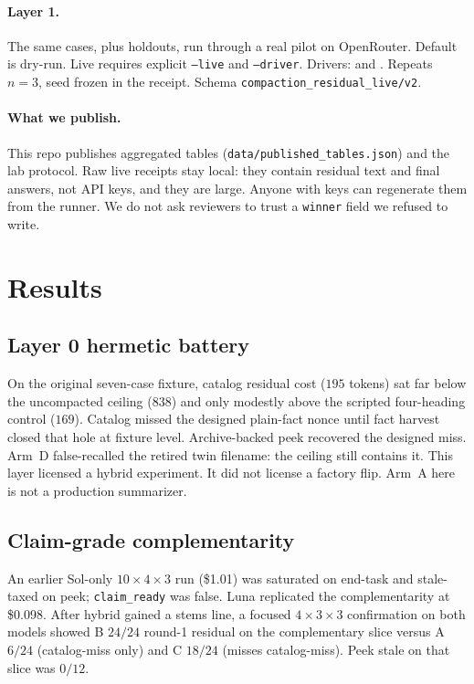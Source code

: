 \documentclass[11pt]{article}
\newcommand{\arm}[1]{\textsf{#1}}
\begin{document}
\paragraph{Layer 1.}
The same cases, plus holdouts, run through a real pilot on OpenRouter.
Default is dry-run. Live requires explicit \texttt{--live} and
\texttt{--driver}. Drivers:
 and
. Repeats $n{=}3$, seed frozen
in the receipt. Schema \texttt{compaction\_residual\_live/v2}.

\paragraph{What we publish.}
This repo publishes aggregated tables
(\texttt{data/published\_tables.json}) and the lab protocol. Raw live
receipts stay local: they contain residual text and final answers, not
API keys, and they are large. Anyone with keys can regenerate them
from the runner. We do not ask reviewers to trust a
\texttt{winner} field we refused to write.

\section{Results}
\label{sec:results}

\subsection{Layer 0 hermetic battery}
\label{sec:l0}

On the original seven-case fixture, catalog residual cost ($195$
tokens) sat far below the uncompacted ceiling ($838$) and only modestly
above the scripted four-heading control ($169$). Catalog missed the
designed plain-fact nonce until fact harvest closed that hole at
fixture level. Archive-backed peek recovered the designed miss.
Arm~\arm{D} false-recalled the retired twin filename: the ceiling still
contains it. This layer licensed a hybrid experiment. It did not
license a factory flip. Arm~\arm{A} here is not a production
summarizer.

\subsection{Claim-grade complementarity}
\label{sec:claim}

An earlier Sol-only $10{\times}4{\times}3$ run (\$1.01) was saturated
on end-task and stale-taxed on peek; \texttt{claim\_ready} was false.
Luna replicated the complementarity at \$0.098. After hybrid gained a
stems line, a focused $4{\times}3{\times}3$ confirmation on both
models showed \arm{B} $24/24$ round-1 residual on the complementary
slice versus \arm{A} $6/24$ (catalog-miss only) and \arm{C} $18/24$
(misses catalog-miss). Peek stale on that slice was $0/12$.
\end{document}
